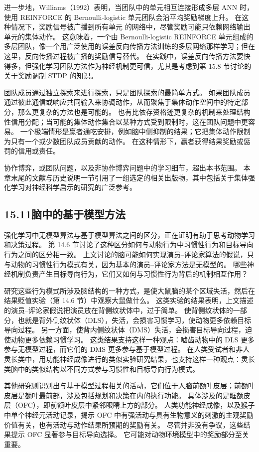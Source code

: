 \documentclass[UTF8,12pt,a4paper,fontset=fandol]{ctexart}
\begin{document}
进一步地，Williams（1992）表明，当团队中的单元相互连接形成多层 ANN 时，使用 REINFORCE 的 Bernoulli-logistic 单元团队会沿平均奖励梯度上升。
在这种情况下，奖励信号被广播到所有单元
的网络中，尽管奖励可能只依赖网络输出单元的集体动作。
这意味着，一个由 Bernoulli-logistic REINFORCE 单元组成的多层团队，像一个用广泛使用的误差反向传播方法训练的多层网络那样学习；但在这里，反向传播过程被广播的奖励信号替代。
在实践中，误差反向传播方法要快得多，但强化学习团队方法作为神经机制更可信，尤其是考虑到第 15.8 节讨论的关于奖励调制 STDP 的知识。

团队成员通过独立探索来进行探索，只是团队探索的最简单方式。
如果团队成员通过彼此通信或响应共同输入来协调动作，从而聚焦于集体动作空间中的特定部分，那么更复杂的方法也是可能的。
也有比依存资格迹更复杂的机制来处理结构性信用分配；当可能的集体动作集合以某种方式受到限制时，这在团队问题中更容易。
一个极端情形是赢者通吃安排，例如脑中侧抑制的结果；它把集体动作限制为只有一个或少数团队成员贡献的动作。
在这种情形下，赢者获得结果奖励或惩罚的信用或责任。

协作博弈，或团队问题，以及非协作博弈问题中的学习细节，超出本书范围。
本章末尾的文献与历史说明一节引用了一组选定的相关出版物，其中包括关于集体强化学习对神经科学启示的研究的广泛参考。

\subsection*{15.11\quad 脑中的基于模型方法}

强化学习中无模型算法与基于模型算法之间的区分，正在证明有助于思考动物学习和决策过程。
第 14.6 节讨论了这种区分如何与动物行为中习惯性行为和目标导向行为之间的区分相一致。
上文讨论的脑可能如何实现演员--评论家算法的假说，只与动物的习惯性行为模式有关，因为基本的演员--评论家方法是无模型的。
哪些神经机制负责产生目标导向行为，它们又如何与习惯性行为背后的机制相互作用？

研究这些行为模式所涉及脑结构的一种方式，是使大鼠脑的某个区域失活，然后在结果贬值实验（第 14.6 节）中观察大鼠做什么。
这类实验的结果表明，上文描述的演员--评论家假说把演员放在背侧纹状体中，过于简单。
使背侧纹状体的一部分，也就是背外侧纹状体（DLS），失活，会损害习惯学习，使动物更多依赖目标导向过程。
另一方面，使背内侧纹状体（DMS）失活，会损害目标导向过程，迫使动物更多依赖习惯学习。
这类结果支持这样一种观点：啮齿动物中的 DLS 更多参与无模型过程，而它们的 DMS 更多参与基于模型过程。
在人类受试者和非人灵长类中，用功能神经成像进行的类似实验研究结果，也支持这样一种观点：灵长类脑中的类似结构以不同方式参与习惯性和目标导向行为模式。

其他研究则识别出与基于模型过程相关的活动，它们位于人脑前额叶皮层；前额叶皮层是额叶最前部，涉及包括规划和决策在内的执行功能。
具体涉及的是眶额皮层（OFC），即前额叶皮层中紧邻眼睛上方的部分。
人类功能神经成像，以及猴子中单个神经元活动记录，揭示 OFC 中有强活动与具有生物意义的刺激的主观奖励价值有关，也有活动与动作结果所预期的奖励有关。
尽管并非没有争议，这些结果提示 OFC 显著参与目标导向选择。
它可能对动物环境模型中的奖励部分至关重要。
\end{document}
